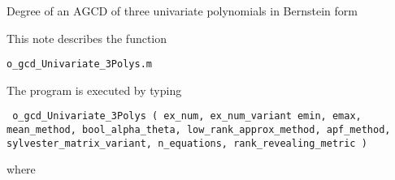 \documentclass{article}
\newcommand{\AGCD}{\textrm{AGCD}}
\begin{document}
\begin{center}
Degree of an $\AGCD$ of three univariate polynomials in Bernstein form
\end{center}
%
\date{}
%

\hrulefill


\vspace{0.5cm}
%
This note describes the function
%
\begin{center}
\texttt{o\_gcd\_Univariate\_3Polys.m}
\end{center}
%
%
The program is executed by typing
%
%
\begin{center}

\texttt
	{
	o\_gcd\_Univariate\_3Polys
	(
		ex\_num, 
		ex\_num\_variant
		emin, 
		emax, 
		mean\_method, 
		bool\_alpha\_theta, 
		low\_rank\_approx\_method, 
		apf\_method, 
		sylvester\_matrix\_variant,
		n\_equations,
		rank\_revealing\_metric
	)}
\end{center}
%
 where
\end{document}
